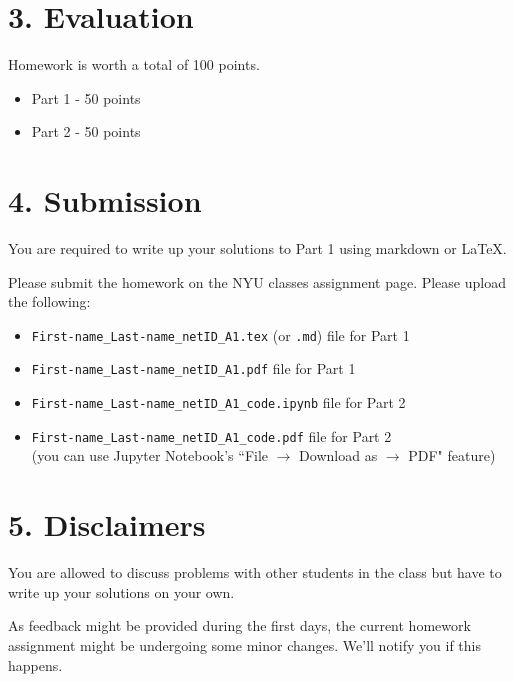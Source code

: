 \documentclass[12pt,letterpaper]{article}
\begin{document}
\section*{3. Evaluation}
Homework is worth a total of 100 points.
\begin{itemize}
    \item Part 1 - 50 points
    \item Part 2 - 50 points
\end{itemize}

\section*{4. Submission}
You are required to write up your solutions to Part 1 using markdown or \LaTeX.

Please submit the homework on the NYU classes assignment page. Please upload the following:
\begin{itemize}
    \item \texttt{First-name\_Last-name\_netID\_A1.tex} (or \texttt{.md}) file for Part 1
    \item \texttt{First-name\_Last-name\_netID\_A1.pdf} file for Part 1
    \item \texttt{First-name\_Last-name\_netID\_A1\_code.ipynb} file for Part 2
    \item 
    \texttt{First-name\_Last-name\_netID\_A1\_code.pdf} file for Part 2\\
    (you can use Jupyter Notebook's ``File $\to$ Download as $\to$ PDF" feature)
\end{itemize}

\section*{5. Disclaimers}
You are allowed to discuss problems with other students in the class but have to write up your solutions on your own. 

As feedback might be provided during the first days, the current homework assignment might be undergoing some minor changes. We'll notify you if this happens.
\end{document}
